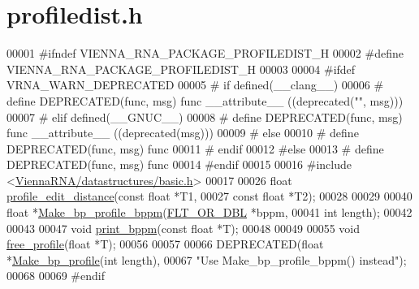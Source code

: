 \hypertarget{profiledist_8h_source}{}\section{profiledist.\+h}
\label{profiledist_8h_source}

\begin{DoxyCode}
00001 \textcolor{preprocessor}{#ifndef VIENNA\_RNA\_PACKAGE\_PROFILEDIST\_H}
00002 \textcolor{preprocessor}{#define VIENNA\_RNA\_PACKAGE\_PROFILEDIST\_H}
00003 
00004 \textcolor{preprocessor}{#ifdef VRNA\_WARN\_DEPRECATED}
00005 \textcolor{preprocessor}{# if defined(\_\_clang\_\_)}
00006 \textcolor{preprocessor}{#  define DEPRECATED(func, msg) func \_\_attribute\_\_ ((deprecated("", msg)))}
00007 \textcolor{preprocessor}{# elif defined(\_\_GNUC\_\_)}
00008 \textcolor{preprocessor}{#  define DEPRECATED(func, msg) func \_\_attribute\_\_ ((deprecated(msg)))}
00009 \textcolor{preprocessor}{# else}
00010 \textcolor{preprocessor}{#  define DEPRECATED(func, msg) func}
00011 \textcolor{preprocessor}{# endif}
00012 \textcolor{preprocessor}{#else}
00013 \textcolor{preprocessor}{# define DEPRECATED(func, msg) func}
00014 \textcolor{preprocessor}{#endif}
00015 
00016 \textcolor{preprocessor}{#include <\hyperlink{datastructures_2basic_8h}{ViennaRNA/datastructures/basic.h}>}
00017 
00026 \textcolor{keywordtype}{float} \hyperlink{profiledist_8h_abe75e90e00a1e5dd8862944ed53dad5d}{profile\_edit\_distance}(\textcolor{keyword}{const} \textcolor{keywordtype}{float} *T1,
00027                             \textcolor{keyword}{const} \textcolor{keywordtype}{float} *T2);
00028 
00029 
00040 \textcolor{keywordtype}{float} *\hyperlink{profiledist_8h_a3dff26e707a2a2e65a0f759caabde6e7}{Make\_bp\_profile\_bppm}(\hyperlink{group__data__structures_ga31125aeace516926bf7f251f759b6126}{FLT\_OR\_DBL}  *bppm,
00041                             \textcolor{keywordtype}{int}         length);
00042 
00043 
00047 \textcolor{keywordtype}{void}  \hyperlink{profiledist_8h_a8e0b4fe3698b3502945116ecc0ba6160}{print\_bppm}(\textcolor{keyword}{const} \textcolor{keywordtype}{float} *T);
00048 
00049 
00055 \textcolor{keywordtype}{void}  \hyperlink{profiledist_8h_a9b0b84a5a45761bf42d7c835dcdb3b85}{free\_profile}(\textcolor{keywordtype}{float} *T);
00056 
00057 
00066 DEPRECATED(\textcolor{keywordtype}{float} *\hyperlink{profiledist_8h_a904c7eaf4a2413567c00ac4891749d18}{Make\_bp\_profile}(\textcolor{keywordtype}{int} length),
00067 \textcolor{stringliteral}{"Use Make\_bp\_profile\_bppm() instead"});
00068 
00069 \textcolor{preprocessor}{#endif}
\end{DoxyCode}
